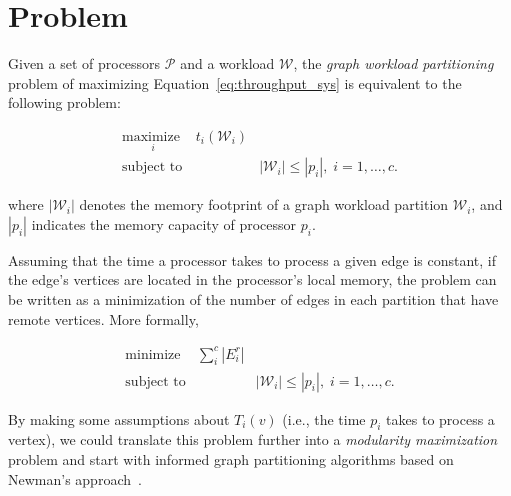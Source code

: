 \section{Problem}
\label{sec:problem}

Given a set of processors $\mathcal{P}$ and a workload $\mathcal{W}$, the {\em graph workload partitioning} problem of maximizing Equation~\ref{eq:throughput_sys} is equivalent to the following problem:

\begin{equation*}
  \begin{aligned}
   \underset{i}{\text{maximize }}
    & t_i(\mathcal{W}_i) \\
    \text{subject to}
    & & |\mathcal{W}_i| \leq |p_i|, \; i = 1, \ldots, c.
  \end{aligned}
\end{equation*}

where $|\mathcal{W}_i|$ denotes the memory footprint of a graph workload partition $\mathcal{W}_i$, and $|p_i|$ indicates the memory capacity of processor $p_i$. 

Assuming that the time a processor takes to process a given edge is constant, if the edge's vertices are located in the processor's local memory, the problem can be written as a minimization of the number of edges in each partition that have remote vertices. More formally,   

\begin{equation*}
  \begin{aligned}
    \text{minimize }
    & \sum_i^c|E_i^r| \\
    \text{subject to}
    & & |\mathcal{W}_i| \leq |p_i|, \; i = 1, \ldots, c.
  \end{aligned}
\end{equation*}


By making some assumptions about $T_i(v)$ (i.e., the time $p_i$ takes to process a vertex), we could translate this problem further into a {\em modularity maximization} problem and start with informed graph partitioning algorithms based on Newman's approach~\cite{Newman2006}.


